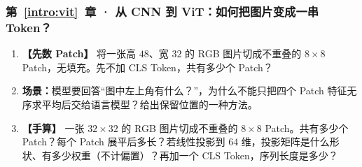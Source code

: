 \subsubsection*{第~\ref*{intro:vit}~章 · 从 CNN 到 ViT：如何把图片变成一串 Token？}
\begin{enumerate}[label={},leftmargin=4.8em,itemsep=4pt]
\item[\textbf{C-128.}] \leavevmode{}\label{exercise:C-128}\label{exercise:rectangular-patch-count}\textbf{【先数 Patch】} 将一张高 $48$、宽 $32$ 的 RGB 图片切成不重叠的 $8\times8$ Patch，无填充。先不加 CLS Token，共有多少个 Patch？
\item[\textbf{C-129.}] \leavevmode{}\label{exercise:C-129}\label{exercise:vit-spatial-order}\textbf{场景：}模型要回答“图中左上角有什么？”，为什么不能只把四个 Patch 特征无序求平均后交给语言模型？给出保留位置的一种方法。
\item[\textbf{C-130.}] \leavevmode{}\label{exercise:C-130}\label{exercise:patch-projection-count}\textbf{【手算】} 一张 $32\times32$ 的 RGB 图片切成不重叠的 $8\times8$ Patch。共有多少个 Patch？每个 Patch 展平后多长？若线性投影到 $64$ 维，投影矩阵是什么形状、有多少权重（不计偏置）？再加一个 CLS Token，序列长度是多少？
\end{enumerate}
